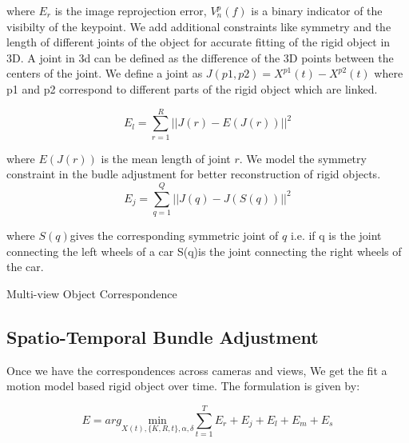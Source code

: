 \documentclass[10pt,twocolumn,letterpaper]{article}
\makeatletter
\def\BState{\State\hskip-\ALG@thistlm}
\makeatother
\begin{document}
where $E_r$ is the image reprojection error, $V_n^p(f)$ is a binary indicator of the visibilty of the keypoint. We add additional constraints like symmetry and the length of different joints of the object for accurate fitting of the rigid object in 3D. A joint in 3d can be defined as the difference of the 3D points between the centers of the joint. We define a joint as $J(p1,p2) = X^{p1}(t) - X^{p2}(t) $ where p1 and p2 correspond to different parts of the rigid object which are linked. 

\begin{equation}
  	E_l = \sum_{r=1}^R ||J(r) - E(J(r))||^2  
\end{equation}

where $E(J(r))$ is the mean length of joint $r$. We model the symmetry constraint in the budle adjustment for better reconstruction of rigid objects.
\begin{equation}
  	E_j = \sum_{q = 1}^Q ||J(q) - J(S(q))||^2
\end{equation}

where $S(q)$gives the corresponding symmetric joint of $q$ i.e. if q is the joint connecting the left wheels of a car S(q)is the joint connecting the right wheels of the car.


\begin{algorithm}
\caption{Multi-view Object Correspondence}\label{euclid}
\end{algorithm}

\subsection{Spatio-Temporal Bundle Adjustment}
Once we have the correspondences across cameras and views, We get the fit a motion model based rigid object over time. The formulation is given by:

\begin{equation}
 E = arg \underset{X(t),\{K,R,t\},\alpha,\delta} {\mathrm{min}} \sum_{t=1}^T E_r +  E_j +  E_l +  E_m + E_s
\end{equation}
\end{document}
